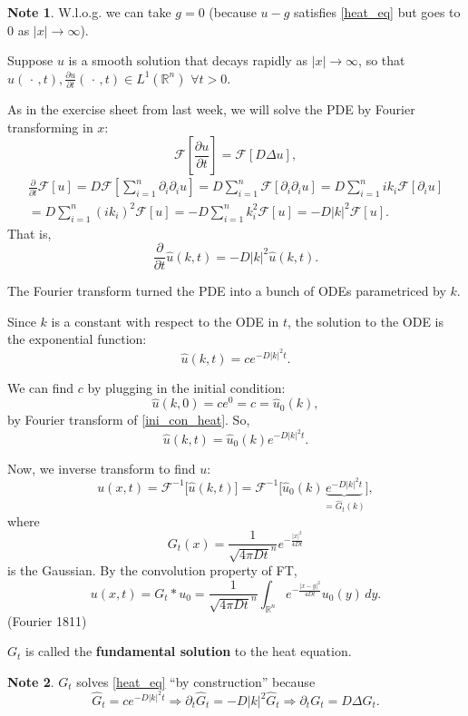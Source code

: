 \documentclass[12pt]{article}
\theoremstyle{definition}
\newtheorem*{note}{Note}
\begin{document}
\begin{note}
W.l.o.g. we can take $g=0$ (because $u-g$ satisfies \eqref{heat_eq} but goes to $0$ as $|x|\to\infty$).
\end{note}

Suppose $u$ is a smooth solution that decays rapidly as $|x|\to\infty$, so that $u(\,\cdot\,,t),\frac{\partial u}{\partial t}(\,\cdot\,,t)\in L^1(\mathbb{R}^n)$ $\forall t>0$.

As in the exercise sheet from last week, we will solve the PDE by Fourier transforming in $x$:
\[\mathcal{F}\left[\frac{\partial u}{\partial t}\right]=\mathcal{F}[D\Delta u],\]
\begin{multline*}
\frac{\partial}{\partial t}\mathcal{F}[u]=D\mathcal{F}\left[\sum_{i=1}^n\partial_i\partial_iu\right]=D\sum_{i=1}^n\mathcal{F}[\partial_i\partial_iu]=D\sum_{i=1}^nik_i\mathcal{F}[\partial_iu]\\
=D\sum_{i=1}^n(ik_i)^2\mathcal{F}[u]=-D\sum_{i=1}^nk_i^2\mathcal{F}[u]=-D|k|^2\mathcal{F}[u].
\end{multline*}
That is,
\[\frac{\partial}{\partial t}\hat{u}(k,t)=-D|k|^2\hat{u}(k,t).\]

The Fourier transform turned the PDE into a bunch of ODEs parametriced by $k$.

Since $k$ is a constant with respect to the ODE in $t$, the solution to the ODE is the exponential function:
\[\hat{u}(k,t)=ce^{-D|k|^2t}.\]

We can find $c$ by plugging in the initial condition:
\[\hat{u}(k,0)=ce^0=c=\hat{u}_0(k),\]
by Fourier transform of \eqref{ini_con_heat}. So,
\[\hat{u}(k,t)=\hat{u}_0(k)e^{-D|k|^2t}.\]

Now, we inverse transform to find $u$:
\[u(x,t)=\mathcal{F}^{-1}\big[\hat{u}(k,t)\big]=\mathcal{F}^{-1}\big[\hat{u}_0(k)\underbrace{e^{-D|k|^2t}}_{=\widehat{G}_t(k)}\big],\]
where
\[G_t(x)=\frac{1}{\sqrt{4\pi Dt}^n}e^{-\frac{|x|^2}{4Dt}}\]
is the Gaussian. By the convolution property of FT,
\[u(x,t)=G_t*u_0=\frac{1}{\sqrt{4\pi Dt}^n}\int_{\mathbb{R}^n}e^{-\frac{|x-y|^2}{4Dt}}u_0(y)\,dy.\]
(Fourier 1811)

$G_t$ is called the \textbf{fundamental solution} to the heat equation.

\begin{note}
$G_t$ solves \eqref{heat_eq} ``by construction'' because
\[\widehat{G}_t=ce^{-D|k|^2t}\Longrightarrow\partial_t\widehat{G}_t=-D|k|^2\widehat{G}_t\Longrightarrow\partial_tG_t=D\Delta G_t.\]
\end{note}
\end{document}
